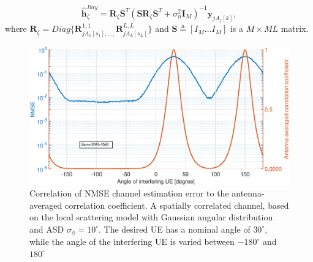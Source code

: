 \begin{equation}
\hat{\mathbf{h}}_{\zeta}^{Bay}=\mathbf{R}_{\zeta}\mathbf{S}^{T}(\mathbf{S}\mathbf{R}_{\zeta}\mathbf{S}^{T}+\sigma_{n}^{2}\mathbf{I}_{M})^{-1}\mathbf{y}_{jA_{j}[k]},
\end{equation}
where $\mathbf{R}_{\zeta}=Diag\{\mathbf{R}^{1,1}_{jA_{1}[s_{1}],...,}\mathbf{R}^{L,L}_{jA_{L}[s_{L}]}\} $ and %
$\mathbf{S}\triangleq[I_{M}...I_{M}]$ is a $M\times ML$ matrix.





\begin{figure}[t!]
	\centering
	\includegraphics[width=1.0\linewidth]{figures/NMSE_correlation.eps}
	\caption{Correlation of NMSE channel estimation error to the antenna-averaged correlation coefficient. A spatially correlated channel, based on
the local scattering model with Gaussian angular distribution and ASD $ \sigma_\phi= 10^\circ$. The desired UE has a nominal angle of $30^\circ$, while the angle of the interfering UE
is varied between $-180^\circ$ and $180^\circ$}
	\label{fig:channel_correlation_model}
\end{figure}

